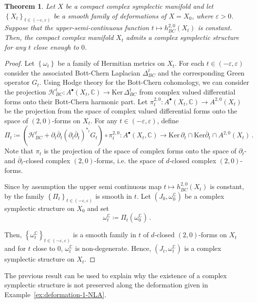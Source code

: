 \documentclass[a4paper]{amsart}
\newtheorem{theorem}{Theorem}[section]
\theoremstyle{definition}
\theoremstyle{remark}
\numberwithin{equation}{section}
\begin{document}
\begin{theorem}\label{thm:stability-1}
Let $X$ be a compact complex symplectic manifold and let $\left\lbrace X_t\right\rbrace_{t\in (-\varepsilon,\varepsilon)}$ be a smooth family of deformations of $X = X_0$, where $\varepsilon> 0$. Suppose that the upper-semi-continuous function $t\mapsto h^{2,0}_{BC}(X_t)$ is constant. Then, the compact complex manifold $X_t$ admits a complex symplectic structure for any $t$ close enough to $0$.
\end{theorem}
\begin{proof}
Let $\left\lbrace \omega_t\right\rbrace$ be a family of Hermitian metrics on $X_t$. For each $t\in (-\varepsilon,\varepsilon)$ consider the associated Bott-Chern Laplacian $\Delta_{BC}^t$ and the corresponding Green operator $G_t$. Using Hodge theory for the Bott-Chern cohomology, we can consider the projection $\mathcal{H}^t_{BC}: A^\bullet(X_t,\mathbb{C})\to \text{Ker}\,\Delta_{BC}^t$ from complex valued differential forms onto their Bott-Chern harmonic part. Let $\pi^{2,0}_t:A^\bullet(X_t,\mathbb{C})\to A^{2,0}(X_t)$ be the projection from the space of complex valued differential forms onto the space of $(2,0)$-forms on $X_t$. For any $t\in (-\varepsilon,\varepsilon)$, define
\[
\Pi_t\coloneqq\left(\mathcal{H}^t_{BC}+\partial_t\overline\partial_t(\partial_t\overline\partial_t)^{*_t}{G_t}\right)\circ \pi^{2,0}_t:A^\bullet(X_t,\mathbb{C})\to \text{Ker}\,\partial_t\cap\text{Ker}\overline\partial_t\cap A^{2,0}(X_t)\,.
\]
Note that $\pi_t$ is the projection of the space of complex forms onto the space of $\partial_t$- and $\overline{\partial}_t$-closed complex $(2,0)$-forms, i.e. the space of $d$-closed complex $(2,0)$-forms.
		
Since by assumption the upper semi continuous map $t\mapsto h^{2,0}_{BC}(X_t)$ is constant, by \cite[Theorem 5]{kodaira-spencer} the family $\left\lbrace\Pi_t\right\rbrace_{t\in (-\varepsilon,\varepsilon)}$ is smooth in $t$. Let $(J_0,\omega_0^\mathbb{C})$ be a complex symplectic structure on $X_0$ and set
\[
\omega_t^\mathbb{C}\coloneqq\Pi_t(\omega_0^\mathbb{C})\,.
\]
		
Then, $\left\lbrace\omega_t^\mathbb{C}\right\rbrace_{t\in (-\varepsilon,\varepsilon)}$ is a smooth family in $t$ of $d$-closed $(2,0)$-forms on $X_t$ and for $t$ close to $0$, $\omega_t^\mathbb{C}$ is non-degenerate. Hence, $(J_t,\omega_t^\mathbb{C})$ is a complex symplectic structure on $X_t$.
\end{proof}


The previous result can be used to explain why the existence of a complex symplectic structure is not preserved along the deformation given in Example~\ref{ex:deformation-1-NLA}.
\end{document}
